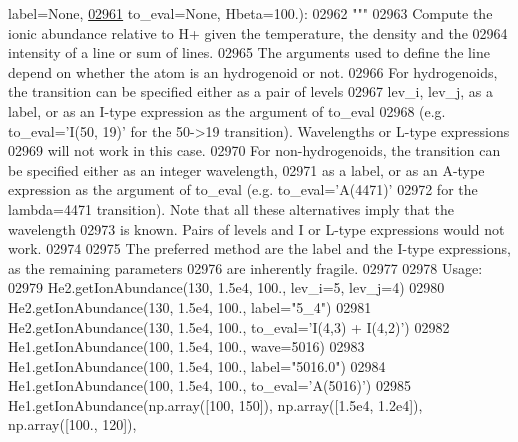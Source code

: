 \begin{DoxyCode}
{{{{{{{{{{{{{{{{{{{{{{      label=None,
\hypertarget{pynebcore_8py_source_l02961}{}\hyperlink{classpyneb_1_1core_1_1pynebcore_1_1_rec_atom_a250ec6b99eedd84bdb8eae97cbd4beef}{02961}                         to\_eval=\textcolor{keywordtype}{None}, Hbeta=100.):
02962         \textcolor{stringliteral}{"""}
02963 \textcolor{stringliteral}{        Compute the ionic abundance relative to H+ given the temperature, the density and the }
02964 \textcolor{stringliteral}{            intensity of a line or sum of lines.}
02965 \textcolor{stringliteral}{        The arguments used to define the line depend on whether the atom is an hydrogenoid or not. }
02966 \textcolor{stringliteral}{        For hydrogenoids, the transition can be specified either as a pair of levels }
02967 \textcolor{stringliteral}{            lev\_i, lev\_j, as a label, or as an I-type expression as the argument of to\_eval }
02968 \textcolor{stringliteral}{            (e.g. to\_eval='I(50, 19)' for the 50->19 transition). Wavelengths or L-type expressions }
02969 \textcolor{stringliteral}{            will not work in this case. }
02970 \textcolor{stringliteral}{        For non-hydrogenoids, the transition can be specified either as an integer wavelength, }
02971 \textcolor{stringliteral}{            as a label, or as an A-type expression as the argument of to\_eval (e.g. to\_eval='A(4471)' }
02972 \textcolor{stringliteral}{            for the lambda=4471 transition). Note that all these alternatives imply that the wavelength}
02973 \textcolor{stringliteral}{            is known. Pairs of levels and I or L-type expressions would not work.}
02974 \textcolor{stringliteral}{}
02975 \textcolor{stringliteral}{        The preferred method are the label and the I-type expressions, as the remaining parameters }
02976 \textcolor{stringliteral}{            are inherently fragile.}
02977 \textcolor{stringliteral}{}
02978 \textcolor{stringliteral}{        Usage:}
02979 \textcolor{stringliteral}{            He2.getIonAbundance(130, 1.5e4, 100., lev\_i=5, lev\_j=4)}
02980 \textcolor{stringliteral}{            He2.getIonAbundance(130, 1.5e4, 100., label="5\_4")}
02981 \textcolor{stringliteral}{            He2.getIonAbundance(130, 1.5e4, 100., to\_eval='I(4,3) + I(4,2)')}
02982 \textcolor{stringliteral}{            He1.getIonAbundance(100, 1.5e4, 100., wave=5016)}
02983 \textcolor{stringliteral}{            He1.getIonAbundance(100, 1.5e4, 100., label="5016.0")}
02984 \textcolor{stringliteral}{            He1.getIonAbundance(100, 1.5e4, 100., to\_eval='A(5016)')}
02985 \textcolor{stringliteral}{            He1.getIonAbundance(np.array([100, 150]), np.array([1.5e4, 1.2e4]), np.array([100., 120]), }
}}}}}}}}}}}}}}}}}}}}}}
\end{DoxyCode}
